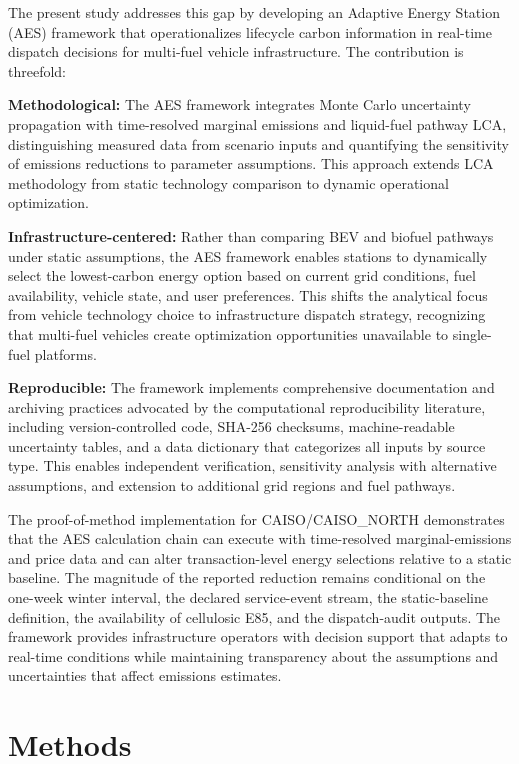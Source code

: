 \documentclass[cleantechnol,article,submit,pdftex,moreauthors]{Definitions/mdpi}
\begin{document}
The present study addresses this gap by developing an Adaptive Energy Station (AES) framework that operationalizes lifecycle carbon information in real-time dispatch decisions for multi-fuel vehicle infrastructure. The contribution is threefold:

\textbf{Methodological:} The AES framework integrates Monte Carlo uncertainty propagation with time-resolved marginal emissions and liquid-fuel pathway LCA, distinguishing measured data from scenario inputs and quantifying the sensitivity of emissions reductions to parameter assumptions. This approach extends LCA methodology from static technology comparison to dynamic operational optimization.

\textbf{Infrastructure-centered:} Rather than comparing BEV and biofuel pathways under static assumptions, the AES framework enables stations to dynamically select the lowest-carbon energy option based on current grid conditions, fuel availability, vehicle state, and user preferences. This shifts the analytical focus from vehicle technology choice to infrastructure dispatch strategy, recognizing that multi-fuel vehicles create optimization opportunities unavailable to single-fuel platforms.

\textbf{Reproducible:} The framework implements comprehensive documentation and archiving practices advocated by the computational reproducibility literature, including version-controlled code, SHA-256 checksums, machine-readable uncertainty tables, and a data dictionary that categorizes all inputs by source type. This enables independent verification, sensitivity analysis with alternative assumptions, and extension to additional grid regions and fuel pathways.

The proof-of-method implementation for CAISO/CAISO\_NORTH demonstrates that the AES calculation chain can execute with time-resolved marginal-emissions and price data and can alter transaction-level energy selections relative to a static baseline. The magnitude of the reported reduction remains conditional on the one-week winter interval, the declared service-event stream, the static-baseline definition, the availability of cellulosic E85, and the dispatch-audit outputs. The framework provides infrastructure operators with decision support that adapts to real-time conditions while maintaining transparency about the assumptions and uncertainties that affect emissions estimates.


\section{Methods}
\label{sec:methods}
\end{document}
